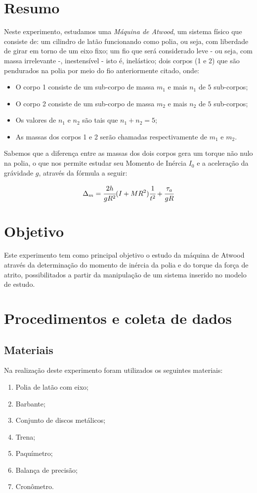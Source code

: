 \documentclass[a4paper]{article}
\begin{document}
\section{Resumo}
Neste experimento, estudamos uma \emph{Máquina de Atwood}, um sistema físico que consiste de: um cilindro de latão funcionando como polia, ou seja, com liberdade de girar em torno de um eixo fixo; um fio que será considerado leve - ou seja, com massa irrelevante -, inestensível - isto é, inelástico; dois corpos (1 e 2) que são pendurados na polia por meio do fio anteriormente citado, onde:
\begin{itemize} 
	\item O corpo 1 consiste de um sub-corpo de massa ${m}_{1}$ e mais $n_{1}$ de $5$ sub-corpos; 
	\item O corpo 2 consiste de um sub-corpo de massa ${m}_{2}$ e mais $n_{2}$ de $5$ sub-corpos; 
	\item Os valores de $n_{1}$ e $n_{2}$ são tais que $n_{1}+n_{2}=5$; 
	\item As massas dos corpos 1 e 2 serão chamadas respectivamente de $m_{1}$ e $m_{2}$.
\end {itemize} 

Sabemos que a diferença entre as massas dos dois corpos gera um torque não nulo na polia, o que nos permite estudar seu Momento de Inércia $I_{0}$ e a aceleração da grávidade $g$, através da fórmula a seguir:

\begin{align}
\Delta_m=\cfrac{2h}{gR^{2}}(I+MR^{2})\ensuremath{\cfrac{1}{t^{2}}}+\cfrac{\tau_{a}}{gR}
\end{align}


\section{Objetivo}
	Este experimento tem como principal objetivo o estudo da máquina de Atwood através da determinação do momento de inércia da polia e do torque da força de atrito, possibilitados a partir da manipulação de um sistema inserido no modelo de estudo.


\section{Procedimentos e coleta de dados}
\subsection{Materiais}
Na realização deste experimento foram utilizados os seguintes materiais: 
\begin{enumerate} 
	\item Polia de latão com eixo;
	\item Barbante;
	\item Conjunto de discos metálicos;
	\item Trena;
	\item Paquímetro;
	\item Balança de precisão;
	\item Cronômetro.
 \end {enumerate} 
\end{document}
